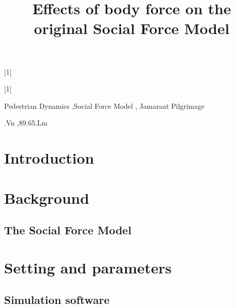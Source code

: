 \documentclass[preprint,12pt]{elsarticle}
\begin{document}
\newcommand*{\hwplotB}{\raisebox{3pt}{\tikz{\draw[red,dashed,line 
width=3.2pt](0,0) -- 
(5mm,0);}}}

\newrobustcmd*{\mydiamond}[1]{}

\newrobustcmd*{\mytriangleleft}[1]{}

\begin{frontmatter}


\title{Effects of body force on the original Social Force Model}


\begin{abstract}

\end{abstract}

\begin{keyword}

Pedestrian Dynamics \sep Social Force Model \sep 
Jamaraat Pilgrimage


.Vn \sep 89.65.Lm

\end{keyword}

\end{frontmatter}


\section{\label{introduction}Introduction}

\section{\label{background}Background}

\subsection{\label{sfm}The Social Force Model}


\section{\label{simulations}Setting and parameters}

\subsection{\label{software} Simulation software}
\end{document}
